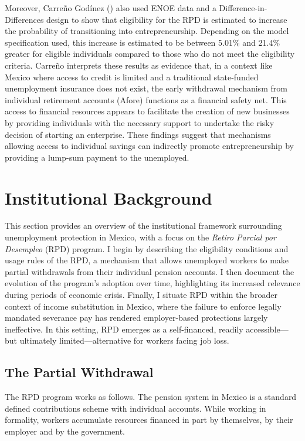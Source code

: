 \documentclass[
  4pt,
]{report}
\begin{document}
Moreover, Carreño Godínez
() also used ENOE data and
a Difference-in-Differences design to show that eligibility for the RPD
is estimated to increase the probability of transitioning into
entrepreneurship. Depending on the model specification used, this
increase is estimated to be between 5.01\% and 21.4\% greater for
eligible individuals compared to those who do not meet the eligibility
criteria. Carreño interprets these results as evidence that, in a
context like Mexico where access to credit is limited and a traditional
state-funded unemployment insurance does not exist, the early withdrawal
mechanism from individual retirement accounts (Afore) functions as a
financial safety net. This access to financial resources appears to
facilitate the creation of new businesses by providing individuals with
the necessary support to undertake the risky decision of starting an
enterprise. These findings suggest that mechanisms allowing access to
individual savings can indirectly promote entrepreneurship by providing
a lump-sum payment to the unemployed.

\chapter{Institutional Background}\label{sec-context}

This section provides an overview of the institutional framework
surrounding unemployment protection in Mexico, with a focus on the
\emph{Retiro Parcial por Desempleo} (RPD) program. I begin by describing
the eligibility conditions and usage rules of the RPD, a mechanism that
allows unemployed workers to make partial withdrawals from their
individual pension accounts. I then document the evolution of the
program's adoption over time, highlighting its increased relevance
during periods of economic crisis. Finally, I situate RPD within the
broader context of income substitution in Mexico, where the failure to
enforce legally mandated severance pay has rendered employer-based
protections largely ineffective. In this setting, RPD emerges as a
self-financed, readily accessible---but ultimately limited---alternative
for workers facing job loss.

\section{The Partial Withdrawal}\label{the-partial-withdrawal}

The RPD program works as follows. The pension system in Mexico is a
standard defined contributions scheme with individual accounts. While
working in formality, workers accumulate resources financed in part by
themselves, by their employer and by the government.
\end{document}
